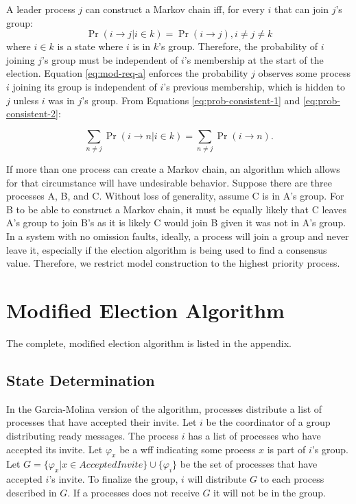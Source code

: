 A leader process $j$ can construct a Markov chain iff, for every $i$ that can join $j$'s group:
\begin{equation}
\Pr(i \rightarrow j | i \in k) = \Pr(i \rightarrow j), i \neq j \neq k
\label{eq:mod-req-a}
\end{equation}
where $i \in k$ is a state where $i$ is in $k$'s group.
Therefore, the probability of $i$ joining $j$'s group must be independent of $i$'s membership at the start of the election.
Equation \ref{eq:mod-req-a} enforces the probability $j$ observes some process $i$ joining its group is independent of $i$'s previous membership, which is hidden to $j$ unless $i$ was in $j$'s group.
From Equations \ref{eq:prob-consistent-1} and \ref{eq:prob-consistent-2}:

\begin{equation}
\sum_{n \neq j} \Pr(i \rightarrow n | i \in k) = \sum_{n\neq j} \Pr(i \rightarrow n).
\label{eq:mod-req-b}
\end{equation}

If more than one process can create a Markov chain, an algorithm which allows for that circumstance will have undesirable behavior.
Suppose there are three processes A, B, and C.
Without loss of generality, assume C is in A's group.
For B to be able to construct a Markov chain, it must be equally likely that C leaves A's group to join B's as it is likely C would join B given it was not in A's group.
In a system with no omission faults, ideally, a process will join a group and never leave it, especially if the election algorithm is being used to find a consensus value.
Therefore, we restrict model construction to the highest priority process.

\section{Modified Election Algorithm}

The complete, modified election algorithm is listed in the appendix.

\subsection{State Determination}

In the Garcia-Molina version of the algorithm, processes distribute a list of processes that have accepted their invite.
Let $i$ be the coordinator of a group distributing ready messages.
The process $i$ has a list of processes who have accepted its invite.
Let $\varphi_x$ be a wff indicating some process $x$ is part of $i$'s group.
Let $G = \{ \varphi_x | x \in AcceptedInvite \} \cup \{ \varphi_i \}$ be the set of processes that have accepted $i$'s invite.
To finalize the group, $i$ will distribute $G$ to each process described in $G$.
If a processes does not receive $G$ it will not be in the group.

